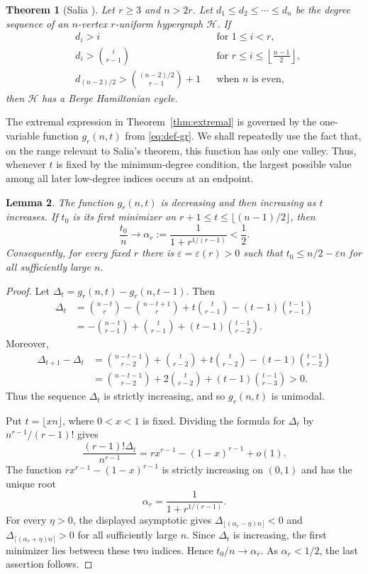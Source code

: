 \documentclass[12pt]{article}
\newtheorem{theorem}{Theorem}[section]
\newtheorem{lemma}[theorem]{Lemma}
\newcommand{\Hcal}{\mathcal H}
\begin{document}
\begin{theorem}[Salia \cite{Salia_2024}]\label{thm:salia}
Let $r\ge 3$ and $n>2r$.  Let
$d_1\le d_2\le \cdots\le d_n$ be the degree sequence of an
$n$-vertex $r$-uniform hypergraph $\Hcal$.  If
$$
\begin{aligned}
&d_i>i &&\text{for }1\le i<r,\\
&d_i>\binom{i}{r-1} &&\text{for }r\le i\le \left\lfloor\frac{n-1}{2}\right\rfloor,\\
&d_{(n-2)/2}>\binom{(n-2)/2}{r-1}+1 &&\text{when }n\text{ is even},
\end{aligned}
$$
then $\Hcal$ has a Berge Hamiltonian cycle.
\end{theorem}

The extremal expression in Theorem~\ref{thm:extremal} is governed by the
one-variable function $g_r(n,t)$ from \eqref{eq:def-gr}.  We shall
repeatedly use the fact that, on the range relevant to Salia's theorem, this
function has only one valley.
Thus, whenever $t$ is fixed by the minimum-degree condition, the largest
possible value among all later low-degree indices occurs at an endpoint.

\begin{lemma}\label{lem:g-unimodal}
The function $g_r(n,t)$ is decreasing and then increasing as $t$
increases.  If $t_0$ is its first minimizer on
$r+1\le t\le \lfloor (n-1)/2\rfloor$, then
$$
        \frac{t_0}{n}\to
        \alpha_r:=\frac{1}{1+r^{1/(r-1)}}<\frac12 .
$$
Consequently, for every fixed $r$ there is $\varepsilon=\varepsilon(r)>0$
such that $t_0\le n/2-\varepsilon n$ for all sufficiently large $n$.
\end{lemma}

\begin{proof}
Let $\Delta_t=g_r(n,t)-g_r(n,t-1)$.  Then
$$
\begin{aligned}
\Delta_t
&=\binom{n-t}{r}-\binom{n-t+1}{r}
  +t\binom{t}{r-1}-(t-1)\binom{t-1}{r-1}\\
&=-\binom{n-t}{r-1}
  +\binom{t}{r-1}+(t-1)\binom{t-1}{r-2}.
\end{aligned}
$$
Moreover,
$$
\begin{aligned}
\Delta_{t+1}-\Delta_t
&=\binom{n-t-1}{r-2}
  +\binom{t}{r-2}
  +t\binom{t}{r-2}
  -(t-1)\binom{t-1}{r-2}\\
&=\binom{n-t-1}{r-2}
  +2\binom{t}{r-2}
  +(t-1)\binom{t-1}{r-3}>0 .
\end{aligned}
$$
Thus the sequence $\Delta_t$ is strictly increasing, and so $g_r(n,t)$ is
unimodal.

Put $t=\lfloor xn\rfloor$, where $0<x<1$ is fixed.  Dividing the formula
for $\Delta_t$ by $n^{r-1}/(r-1)!$ gives
$$
        \frac{(r-1)!\Delta_t}{n^{r-1}}
        =r x^{r-1}-(1-x)^{r-1}+o(1).
$$
The function $r x^{r-1}-(1-x)^{r-1}$ is strictly increasing on $(0,1)$
and has the unique root
$$
        \alpha_r=\frac{1}{1+r^{1/(r-1)}}.
$$
For every $\eta>0$, the displayed asymptotic gives
$\Delta_{\lfloor(\alpha_r-\eta)n\rfloor}<0$ and
$\Delta_{\lceil(\alpha_r+\eta)n\rceil}>0$ for all sufficiently large
$n$.  Since $\Delta_t$ is increasing, the first minimizer lies between
these two indices.  Hence $t_0/n\to \alpha_r$.  As $\alpha_r<1/2$, the
last assertion follows.
\end{proof}
\end{document}
